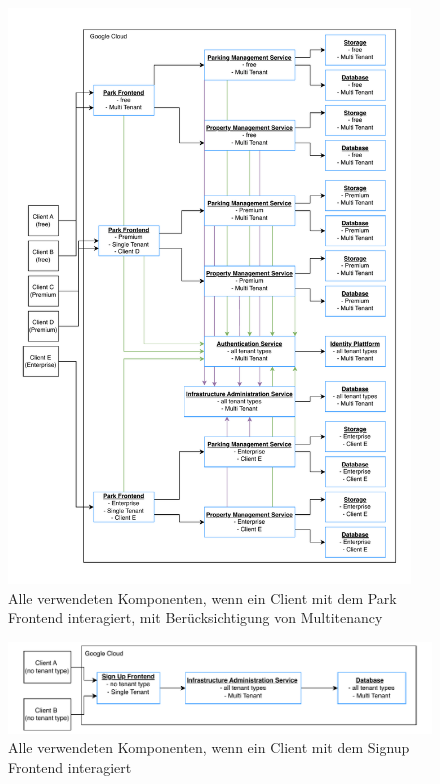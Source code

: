 \begin{figure}[ht]
  \centering
  \includegraphics[width=0.95\textwidth]{resources/03-runtime-view/pdf/components-frontend-park.pdf}
  \caption{Alle verwendeten Komponenten, wenn ein Client mit dem Park Frontend interagiert, mit Berücksichtigung von Multitenancy}
  \label{fig:components-park-frontend}
\end{figure}

\begin{figure}[ht]
  \centering
  \includegraphics[width=\textwidth]{resources/03-runtime-view/pdf/components-frontend-signup.pdf}
  \caption{Alle verwendeten Komponenten, wenn ein Client mit dem Signup Frontend interagiert}
  \label{fig:components-signup-frontend}
\end{figure}

